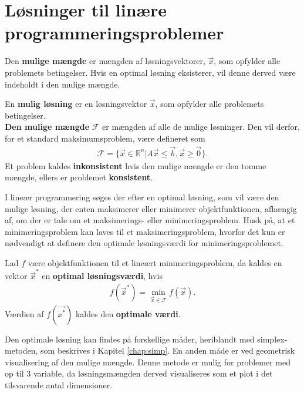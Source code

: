\section{Løsninger til linære programmeringsproblemer}

Den \textbf{mulige mængde} er mængden af løsningsvektorer, $\vec{x}$, som opfylder alle problemets betingelser. Hvis en optimal løsning eksisterer, vil denne derved være indeholdt i den mulige mængde.

\begin{defn}
En \textbf{mulig løsning} er en løsningsvektor $\vec{x}$, som opfylder alle problemets betingelser.\\
\textbf{Den mulige mængde} $\mathcal{F}$ er mængden af alle de mulige løsninger. Den vil derfor, for et standard maksimumsproblem, være defineret som
\begin{align*}
\mathcal{F}=\{\vec{x} \in \mathds{R}^n|A\vec{x} \leq \vec{b}, \vec{x} \geq \vec{0}\}.
\end{align*}
Et problem kaldes \textbf{inkonsistent}  hvis den mulige mængde er den tomme mængde, ellers er problemet \textbf{konsistent}. 
\end{defn}

I lineær programmering søges der efter en optimal løsning, som vil være den mulige løsning, der enten maksimerer eller minimerer objektfunktionen, afhængig af, om der er tale om et maksimerings- eller minimeringsproblem. 
Husk på, at et minimeringsproblem kan laves til et maksimeringsproblem, hvorfor det kun er nødvendigt at definere den optimale løsningsværdi for minimeringsproblemet.
\begin{defn}
Lad $f$ være objektfunktionen til et lineært minimeringsproblem, da kaldes en vektor $\vec{x}^*$ en \textbf{optimal løsningsværdi}, hvis 
\begin{align}
	f(\vec{x}^*)=\min\limits_{\vec{x} \in \mathcal{F}}f(\vec{x}).
\end{align}
Værdien af $f(\vec{x^*})$ kaldes den \textbf{optimale værdi}.
\end{defn}

Den optimale løsning kan findes på forskellige måder, heriblandt med simplex-metoden, som beskrives i Kapitel \ref{chap:simp}. En anden måde er ved geometrisk visualisering af den mulige mængde. Denne metode er mulig for problemer med op til 3 variable, da løsningsmængden derved visualiseres som et plot i det tilsvarende antal dimensioner. 

